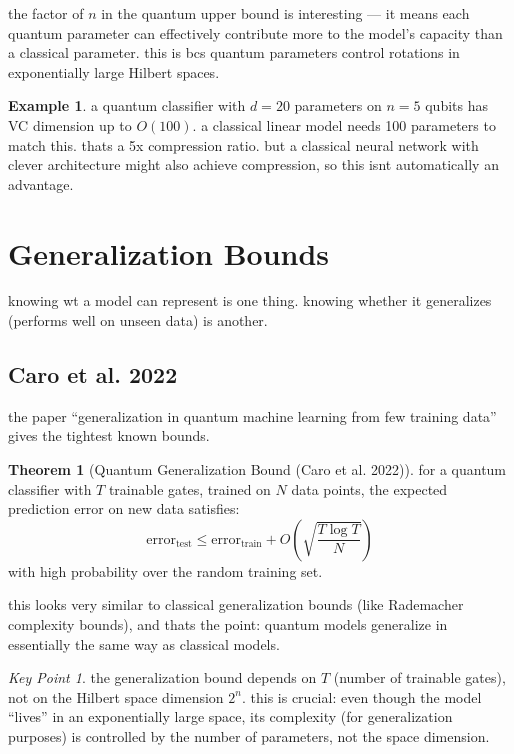 \documentclass[11pt,a4paper]{article}
\theoremstyle{definition}
\newtheorem{example}{Example}[section]
\newtheorem{theorem}{Theorem}[section]
\theoremstyle{remark}
\newtheorem*{keypoint}{Key Point}
\begin{document}
the factor of $n$ in the quantum upper bound is interesting --- it means each quantum parameter can effectively contribute more to the model's capacity than a classical parameter. this is bcs quantum parameters control rotations in exponentially large Hilbert spaces.

\begin{example}
a quantum classifier with $d = 20$ parameters on $n = 5$ qubits has VC dimension up to $O(100)$. a classical linear model needs 100 parameters to match this. thats a 5x compression ratio. but a classical neural network with clever architecture might also achieve compression, so this isnt automatically an advantage.
\end{example}

\section{Generalization Bounds}

knowing wt a model can represent is one thing. knowing whether it generalizes (performs well on unseen data) is another.

\subsection{Caro et al. 2022}

the paper ``generalization in quantum machine learning from few training data'' gives the tightest known bounds.

\begin{theorem}[Quantum Generalization Bound (Caro et al. 2022)]
for a quantum classifier with $T$ trainable gates, trained on $N$ data points, the expected prediction error on new data satisfies:
\[
\text{error}_{\text{test}} \leq \text{error}_{\text{train}} + O\left(\sqrt{\frac{T \log T}{N}}\right)
\]
with high probability over the random training set.
\end{theorem}

this looks very similar to classical generalization bounds (like Rademacher complexity bounds), and thats the point: quantum models generalize in essentially the same way as classical models.

\begin{keypoint}
the generalization bound depends on $T$ (number of trainable gates), not on the Hilbert space dimension $2^n$. this is crucial: even though the model ``lives'' in an exponentially large space, its complexity (for generalization purposes) is controlled by the number of parameters, not the space dimension.
\end{keypoint}
\end{document}
